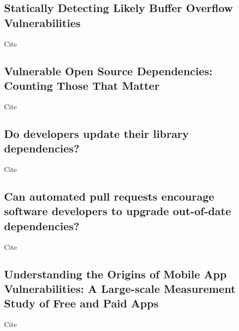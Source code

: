 
\subsection{Statically Detecting Likely Buffer Overflow Vulnerabilities}
\label{subsec:statically-detecting-likely-buffer-overflow-vulnerabilities}

Cite~\cite{larochelle2001}



\subsection{Vulnerable Open Source Dependencies: Counting Those That Matter}
\label{subsec:vulnerable-open-source-dependencies:-counting-those-that-matter}

Cite~\cite{pashchenko2018}



\subsection{Do developers update their library dependencies?}
\label{subsec:do-developers-update-their-library-dependencies?}

Cite~\cite{kula2017}



\subsection{Can automated pull requests encourage software developers to upgrade out-of-date dependencies?}
\label{subsec:can-automated-pull-requests-encourage-software-developers-to-upgrade-out-of-date-dependencies?}

Cite~\cite{mirhosseini2017}


\subsection{Understanding the Origins of Mobile App Vulnerabilities: A Large-scale Measurement Study of Free and Paid Apps}
\label{subsec:understanding-the-origins-of-mobile-app-vulnerabilities:-a-large-scale-measurement-study-of-free-and-paid-apps}

Cite~\cite{watanabe2017}




